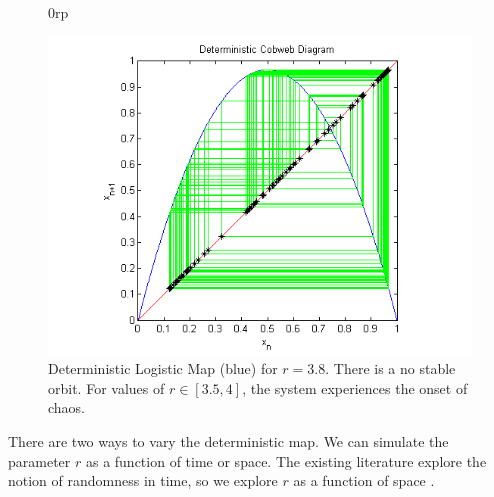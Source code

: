 \documentclass[12pt]{article}
\begin{document}
\begin{figure}[H]0rp
	\begin{center}
		\includegraphics[scale=0.7]{chaos}
\caption{Deterministic Logistic Map (blue) for $r=3.8$. There is a no
  stable orbit. For values of $r \in [3.5,4]$, the system experiences the onset of
chaos.}
	\end{center}
\end{figure}
There are two ways to vary the deterministic map. We can simulate the
parameter $r$ as a function of time or space. The existing literature
explore the notion of randomness in time, so we explore $r$ as a
function of space \cite{athreya}.
\end{document}
